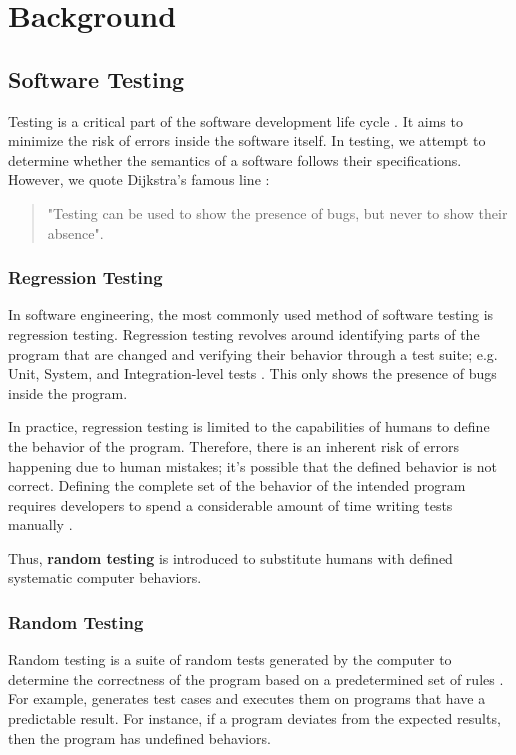 \chapter{Background \label{sec:background}}

\section{Software Testing}
\label{sec:Testing}

Testing is a critical part of the software development life cycle \cite{testing}. It aims to minimize the risk of errors inside the software itself.
In testing, we attempt to determine whether the semantics of a software follows their specifications. However, we quote Dijkstra's famous line \cite{dahl_structured_1972}: 

\begin{quote}
    "Testing can be used to show the presence of bugs, but never to show their absence".
\end{quote}

\subsection{Regression Testing}

In software engineering, the most commonly used method of software testing is regression testing. Regression testing revolves around 
identifying parts of the program that are changed and verifying their behavior through a test suite; e.g. Unit, System, and Integration-level tests
\cite{testing}. This only shows the presence of bugs inside the program.

In practice, regression testing is limited to the capabilities of humans to define the behavior of the program. Therefore, there is an inherent 
risk of errors happening due to human mistakes; it's possible that the defined behavior is not correct. Defining the complete set of the behavior 
of the intended program requires developers to spend a considerable amount of time writing tests manually \cite{differentialTesting}. 

Thus, \textbf{random testing} is introduced to substitute humans with defined systematic computer behaviors.

\subsection{Random Testing}

Random testing is a suite of random tests generated by the computer to determine the correctness of the program based on a predetermined 
set of rules \cite{differentialTesting}. For example, \cite[Sec. 2]{randomTesting} generates test cases and 
executes them on programs that have a predictable result. For instance, if a program deviates from the expected results, then the 
program has undefined behaviors.

